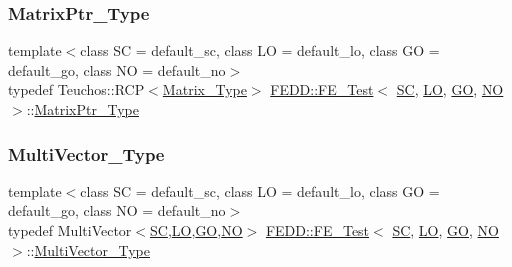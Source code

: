 \mbox{\label{classFEDD_1_1FE__Test_a3c2e34afc3a1495c2b00313399f12b3d}} 
\subsubsection{\texorpdfstring{Matrix\+Ptr\+\_\+\+Type}{MatrixPtr\_Type}}
{\footnotesize\ttfamily template$<$class SC  = default\+\_\+sc, class LO  = default\+\_\+lo, class GO  = default\+\_\+go, class NO  = default\+\_\+no$>$ \\
typedef Teuchos\+::\+R\+CP$<$\hyperlink{classFEDD_1_1FE__Test_ab21a3d554ec8bf6763a7dabcbe800b35}{Matrix\+\_\+\+Type}$>$ \hyperlink{classFEDD_1_1FE__Test}{F\+E\+D\+D\+::\+F\+E\+\_\+\+Test}$<$ \hyperlink{fe__test__laplace_8cpp_a79c7e86a57edbb2a5a53242bcd04e41e}{SC}, \hyperlink{fe__test__laplace_8cpp_ad6a38c9f07d3fd633eefca5bccad8410}{LO}, \hyperlink{fe__test__laplace_8cpp_afa2946b509009b4f45eb04bd8c5b27d9}{GO}, \hyperlink{fe__test__laplace_8cpp_a5e24f37b28787429872b6ecb1d0417ce}{NO} $>$\+::\hyperlink{classFEDD_1_1FE__Test_a3c2e34afc3a1495c2b00313399f12b3d}{Matrix\+Ptr\+\_\+\+Type}}

\mbox{\label{classFEDD_1_1FE__Test_a431ec5a97628feb8a0a8d16874ecd060}} 
\subsubsection{\texorpdfstring{Multi\+Vector\+\_\+\+Type}{MultiVector\_Type}}
{\footnotesize\ttfamily template$<$class SC  = default\+\_\+sc, class LO  = default\+\_\+lo, class GO  = default\+\_\+go, class NO  = default\+\_\+no$>$ \\
typedef Multi\+Vector$<$\hyperlink{fe__test__laplace_8cpp_a79c7e86a57edbb2a5a53242bcd04e41e}{SC},\hyperlink{fe__test__laplace_8cpp_ad6a38c9f07d3fd633eefca5bccad8410}{LO},\hyperlink{fe__test__laplace_8cpp_afa2946b509009b4f45eb04bd8c5b27d9}{GO},\hyperlink{fe__test__laplace_8cpp_a5e24f37b28787429872b6ecb1d0417ce}{NO}$>$ \hyperlink{classFEDD_1_1FE__Test}{F\+E\+D\+D\+::\+F\+E\+\_\+\+Test}$<$ \hyperlink{fe__test__laplace_8cpp_a79c7e86a57edbb2a5a53242bcd04e41e}{SC}, \hyperlink{fe__test__laplace_8cpp_ad6a38c9f07d3fd633eefca5bccad8410}{LO}, \hyperlink{fe__test__laplace_8cpp_afa2946b509009b4f45eb04bd8c5b27d9}{GO}, \hyperlink{fe__test__laplace_8cpp_a5e24f37b28787429872b6ecb1d0417ce}{NO} $>$\+::\hyperlink{classFEDD_1_1FE__Test_a431ec5a97628feb8a0a8d16874ecd060}{Multi\+Vector\+\_\+\+Type}}

